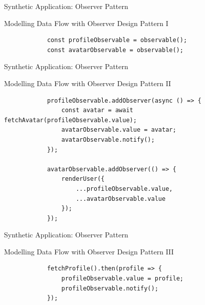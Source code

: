 \documentclass{beamer}
\begin{document}
\begin{frame}[fragile=singleslide]{Synthetic Application: Observer Pattern}
	\begin{block}{Modelling Data Flow with Observer Design Pattern \cite{gamma1995design} I}
		\begin{verbatim}
			const profileObservable = observable();
			const avatarObservable = observable();
		\end{verbatim}
	\end{block}
\end{frame}


\begin{frame}[fragile=singleslide]{Synthetic Application: Observer Pattern}
	\begin{block}{Modelling Data Flow with Observer Design Pattern \cite{gamma1995design} II}
		\begin{verbatim}
			profileObservable.addObserver(async () => {
				const avatar = await fetchAvatar(profileObservable.value);
				avatarObservable.value = avatar;
				avatarObservable.notify();
			});

			avatarObservable.addObserver(() => {
				renderUser({
					...profileObservable.value,
					...avatarObservable.value
				});
			});
		\end{verbatim}
	\end{block}
\end{frame}


\begin{frame}[fragile=singleslide]{Synthetic Application: Observer Pattern}
	\begin{block}{Modelling Data Flow with Observer Design Pattern \cite{gamma1995design} III}
		\begin{verbatim}
			fetchProfile().then(profile => {
				profileObservable.value = profile;
				profileObservable.notify();
			});
		\end{verbatim}
	\end{block}
\end{frame}
\end{document}
